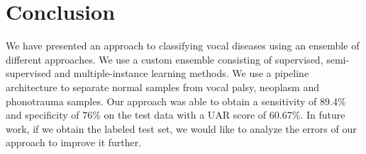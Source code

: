\section{Conclusion}
We have presented an approach to classifying vocal diseases using an ensemble of different approaches. We use a custom ensemble consisting of supervised, semi-supervised and multiple-instance learning methods. We use a pipeline architecture to separate normal samples from vocal palsy, neoplasm and phonotrauma samples. Our approach was able to obtain a sensitivity of 89.4\% and specificity of 76\% on the test data with a UAR score of 60.67\%. In future work, if we obtain the labeled test set, we would like to analyze the errors of our approach to improve it further.